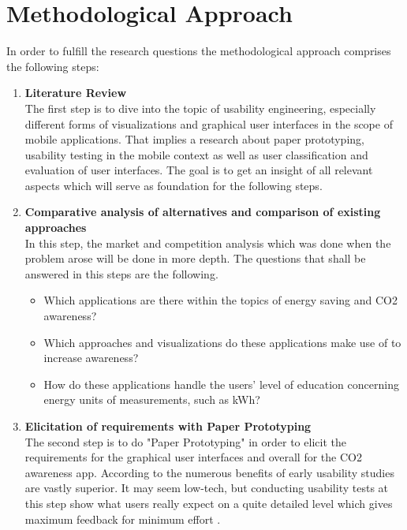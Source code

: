 \section{Methodological Approach}

In order to fulfill the research questions the methodological approach comprises the following steps:
\begin{enumerate}
	\item \textbf{Literature Review} \\
	The first step is to dive into the topic of usability engineering, especially different forms of visualizations and graphical user interfaces in the scope of mobile applications. That implies a research about paper prototyping, usability testing in the mobile context as well as user classification and evaluation of user interfaces. The goal is to get an insight of all relevant aspects which will serve as foundation for the following steps.
	
	\item \textbf{Comparative analysis of alternatives and comparison of existing approaches} \\
	In this step, the market and competition analysis which was done when the problem arose will be done in more depth. The questions that shall be answered in this steps are the following.
	\begin{itemize}
		\item Which applications are there within the topics of energy saving and CO2 awareness?
		\item Which approaches and visualizations do these applications make use of to increase awareness?
		\item How do these applications handle the users' level of education concerning energy units of measurements, such as kWh?
	\end{itemize}
	
	\item \textbf{Elicitation of requirements with Paper Prototyping} \\
	The second step is to do "Paper Prototyping" in order to elicit the requirements for the graphical user interfaces and overall for the CO2 awareness app. According to \cite{lancaster2004paper} the numerous benefits of early usability studies are vastly superior. It may seem low-tech, but conducting usability tests at this step show what users really expect on a quite detailed level which gives maximum feedback for minimum effort \cite{weiss2003handheld}.
	

\end{enumerate}
